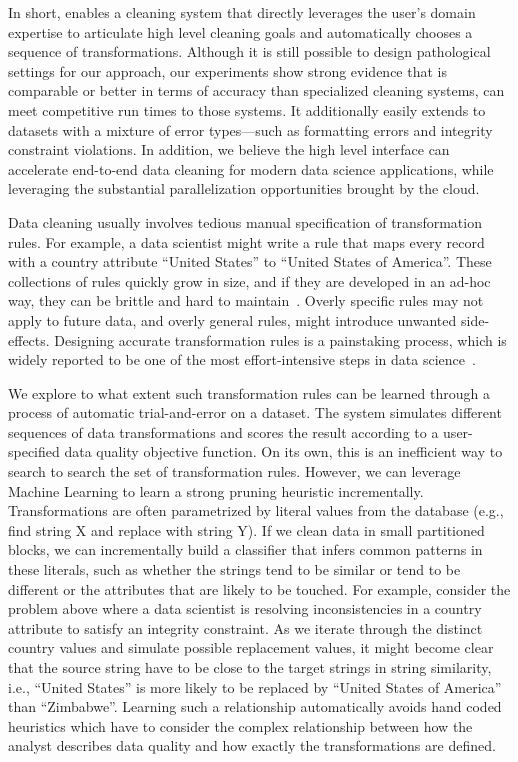 In short, \sys enables a cleaning system that directly leverages the user's domain expertise to articulate high level cleaning goals and automatically chooses a sequence of transformations.  Although it is still possible to design pathological settings for our approach, our experiments show strong evidence that \sys is comparable or better in terms of accuracy than specialized cleaning systems, can meet competitive run times to those systems.
It additionally easily extends to datasets with a mixture of error types---such as formatting errors and integrity constraint violations.   In addition, we believe the high level interface can accelerate end-to-end data cleaning for modern data science applications, while leveraging the substantial parallelization opportunities brought by the cloud. 





Data cleaning usually involves tedious manual specification of transformation rules.
For example, a data scientist might write a rule that maps every record with a \textsf{country} attribute ``United States'' to ``United States of America''.
These collections of rules quickly grow in size, and if they are developed in an ad-hoc way, they can be brittle and hard to maintain~\cite{krishnan2016hilda}.
Overly specific rules may not apply to future data, and overly general rules, might introduce unwanted side-effects.
Designing accurate transformation rules is a painstaking process, which is widely reported to be one of the most effort-intensive steps in data science~\cite{nytimes}.

We explore to what extent such transformation rules can be learned through a process of automatic trial-and-error on a dataset.
The system simulates different sequences of data transformations and scores the result according to a user-specified data quality objective function.
On its own, this is an inefficient way to search to search the set of transformation rules.
However, we can leverage Machine Learning to learn a strong pruning heuristic incrementally.
Transformations are often parametrized by literal values from the database (e.g., find string X and replace with string Y).
If we clean data in small partitioned blocks, we can incrementally build a classifier that infers common patterns in these literals, such as whether the strings tend to be similar or tend to be different or the attributes that are likely to be touched.
For example, consider the problem above where a data scientist is resolving inconsistencies in a \textsf{country} attribute to satisfy an integrity constraint.
As we iterate through the distinct \textsf{country} values and simulate possible replacement values, it might become clear that the source string have to be close to the target strings in string similarity, i.e., ``United States'' is more likely to be replaced by ``United States of America'' than ``Zimbabwe''.
Learning such a relationship automatically avoids hand coded heuristics which have to consider the complex relationship between how the analyst describes data quality and how exactly the transformations are defined.

